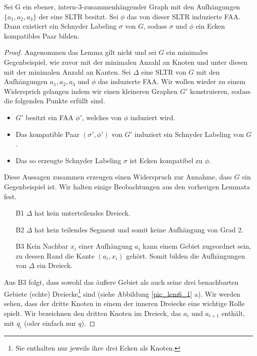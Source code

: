 

\begin{lemma}\label{lem6}
Sei G ein ebener, intern-3-zusammenhängender Graph mit den Aufhängungen $\{a_1,a_2,a_3\}$ der eine SLTR besitzt. Sei $\phi$ das von dieser SLTR induzierte FAA. Dann existiert ein Schnyder Labeling $\sigma$ von $G$, sodass $\sigma$ und $\phi$ ein Ecken kompatibles Paar bilden.
\end{lemma}

\begin{proof}
Angenommen das Lemma gilt nicht und sei $G$ ein minimales Gegenbeispiel, wie zuvor mit der minimalen Anzahl an Knoten und unter diesen mit der minimalen Anzahl an Kanten. Sei $\Delta$ eine SLTR von $G$ mit den Aufhängungen $a_1,a_2,a_3$ und $\phi$ das induzierte FAA. Wir wollen wieder zu einem Widersprich gelangen indem wir einen kleineren Graphen $G'$ konstruieren, sodass die folgenden Punkte erfüllt sind.
\begin{itemize}
\item $G'$ besitzt ein FAA $\phi'$, welches von $\phi$ induziert wird.
\item Das kompatible Paar $(\sigma',\phi')$ von $G'$ induziert ein Schnyder Labeling von $G$.
\item Das so erzeugte Schnyder Labeling $\sigma$ ist Ecken kompatibel zu $\phi$.
\end{itemize}
Diese Aussagen zusammen erzeugen einen Widerspruch zur Annahme, dass $G$ ein Gegenbeispiel ist. Wir halten einige Beobachtungen aus den vorherigen Lemmata fest.
\begin{itemize}
\item [B1] $\Delta$ hat kein unterteilendes Dreieck.
\item [B2] $\Delta$ hat kein teilendes Segment und somit keine Aufhängung von Grad 2.
\item [B3] Kein Nachbar $x_i$ einer Aufhängung $a_i$ kann einem Gebiet zugeordnet sein, zu dessen Rand die Kante $(a_i,x_i)$ gehört. Somit bilden die Aufhängungen von $\Delta$ ein Dreieck.
\end{itemize}

Aus B3 folgt, dass sowohl das äußere Gebiet als auch seine drei benachbarten Gebiete (echte) Dreiecke\footnote{Sie enthalten nur jeweils ihre drei Ecken als Knoten.} sind (siehe Abbildung \ref{pic_lem6_1} a). Wir werden sehen, dass der dritte Knoten in einem der inneren Dreiecke eine wichtige Rolle spielt. Wir bezeichnen den dritten Knoten im Dreieck, das $a_i$ und $a_{i+1}$ enthält, mit $q_i$ (oder einfach nur $q$).


\end{proof}
